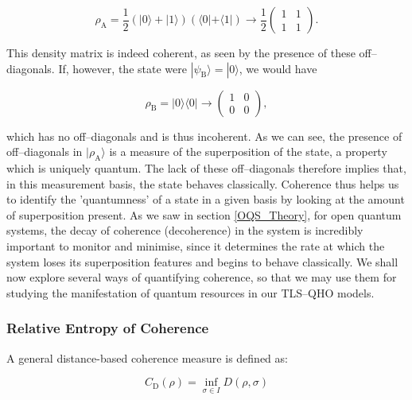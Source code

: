 \documentclass[12pt]{article}
\begin{document}
\begin{equation*}
    \rho_{\scriptscriptstyle \text{A}} = \frac{1}{2}(|0\rangle + |1\rangle)(\langle0| +\langle1|) \rightarrow \frac{1}{2}
    \begin{pmatrix}
        1 & 1 \\
        1 & 1
    \end{pmatrix}.
\end{equation*}

This density matrix is indeed coherent, as seen by the presence of these off--diagonals. If, however, the state were $|\psi_{\scriptscriptstyle \text{B}}\rangle = |0\rangle$, we would have

\begin{equation*}
    \rho_{\scriptscriptstyle \text{B}} = |0\rangle\langle0| \rightarrow 
    \begin{pmatrix}
        1 & 0 \\
        0 & 0
    \end{pmatrix},
\end{equation*}

which has no off--diagonals and is thus incoherent. As we can see, the presence of off--diagonals in $|\rho_{\scriptscriptstyle \text{A}} \rangle$ is a measure of the superposition of the state, a property which is uniquely quantum. The lack of these off--diagonals therefore implies that, in this measurement basis, the state behaves classically. Coherence thus helps us to identify the 'quantumness' of a state in a given basis by looking at the amount of superposition present. As we saw in section \ref{OQS_Theory}, for open quantum systems, the decay of coherence (decoherence) in the system is incredibly important to monitor and minimise,  since it determines the rate at which the system loses its superposition features and begins to behave classically. We shall now explore several ways of quantifying coherence, so that we may use them for studying the manifestation of quantum resources in our TLS--QHO models. 

\subsubsection{Relative Entropy of Coherence}

A general distance-based coherence measure is defined as:

\begin{equation}
    C_{\scriptscriptstyle\text{D}}(\rho) = \inf_{\sigma \in I} D(\rho,\sigma)
\end{equation}
\end{document}
